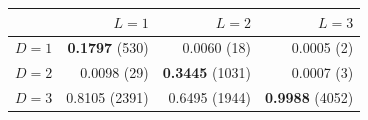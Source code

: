 \begin{tabular}{lrrr}
\toprule
 & $L=1$ & $L=2$ & $L=3$ \\
\midrule
$D=1$ & \textbf{0.1797} (530) & 0.0060 (18) & 0.0005 (2) \\
$D=2$ & 0.0098 (29) & \textbf{0.3445} (1031) & 0.0007 (3) \\
$D=3$ & 0.8105 (2391) & 0.6495 (1944) & \textbf{0.9988} (4052) \\
\bottomrule
\end{tabular}
